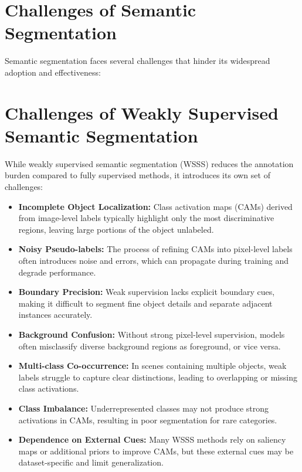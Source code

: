 \section{Challenges of Semantic Segmentation}
\label{sec:challenges_of_semantic_segmentation}
Semantic segmentation faces several challenges that hinder its widespread adoption and effectiveness:

\section{Challenges of Weakly Supervised Semantic Segmentation}
\label{sec:challenges_of_wsss}

While weakly supervised semantic segmentation (WSSS) reduces the annotation burden compared to fully supervised methods, it introduces its own set of challenges:

\begin{itemize}
    \item \textbf{Incomplete Object Localization:} Class activation maps (CAMs) derived from image-level labels typically highlight only the most discriminative regions, leaving large portions of the object unlabeled.
    \item \textbf{Noisy Pseudo-labels:} The process of refining CAMs into pixel-level labels often introduces noise and errors, which can propagate during training and degrade performance.
    \item \textbf{Boundary Precision:} Weak supervision lacks explicit boundary cues, making it difficult to segment fine object details and separate adjacent instances accurately.
    \item \textbf{Background Confusion:} Without strong pixel-level supervision, models often misclassify diverse background regions as foreground, or vice versa.
    \item \textbf{Multi-class Co-occurrence:} In scenes containing multiple objects, weak labels struggle to capture clear distinctions, leading to overlapping or missing class activations.
    \item \textbf{Class Imbalance:} Underrepresented classes may not produce strong activations in CAMs, resulting in poor segmentation for rare categories.
    \item \textbf{Dependence on External Cues:} Many WSSS methods rely on saliency maps or additional priors to improve CAMs, but these external cues may be dataset-specific and limit generalization.
\end{itemize}

